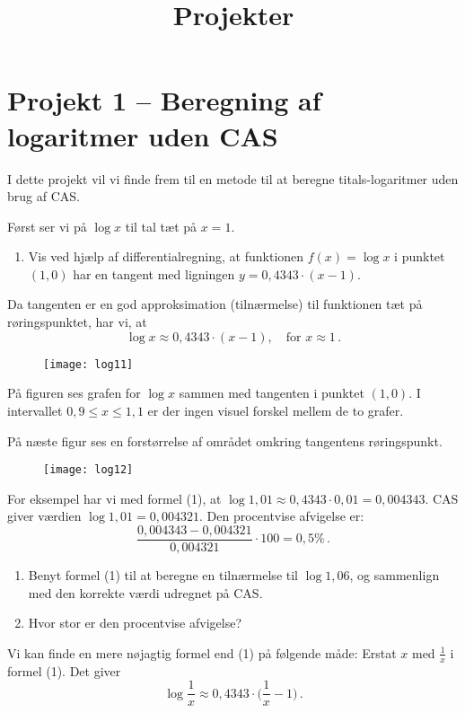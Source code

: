 \documentclass[12pt,oneside,a4paper]{article}
\title{Projekter}
\date{\vspace{-5ex}}
\theoremstyle{plain}
\begin{document}
\maketitle

\section*{Projekt 1 -- Beregning af logaritmer uden CAS}
I dette projekt vil vi finde frem til en metode til at beregne
titals-logaritmer uden brug af CAS.

Først ser vi på $\log x$ til tal tæt på $x=1$.

\begin{enumerate}[label=(\alph*)]
    \item Vis ved hjælp af differentialregning, at funktionen $f(x) = \log x$ i
        punktet $(1, 0)$ har en tangent med ligningen $y = 0,4343 \cdot (x-1)$.
\end{enumerate}
Da tangenten er en god approksimation (tilnærmelse) til funktionen tæt på
røringspunktet, har vi, at 
\[
    \tag{1}
    \log x \approx 0,4343\cdot(x-1),\quad \mbox{for $x\approx 1$}\,.
\]

\begin{figure}[H]
    \centering
    \texttt{[image: log11]}
\end{figure}
På figuren ses grafen for $\log x$ sammen med tangenten i punktet $(1, 0)$. I
intervallet $0,9\le x\le 1,1$ er der ingen visuel forskel mellem de to grafer.

På næste figur ses en forstørrelse af området omkring tangentens røringspunkt.
\begin{figure}[H]
    \centering
    \texttt{[image: log12]}
\end{figure}

For eksempel har vi med formel (1), at $\log 1,01 \approx 0,4343\cdot 0,01 = 0,004343$.
CAS giver værdien $\log 1,01 = 0,004321$. Den procentvise afvigelse er:
\[
    \frac{0,004343-0,004321}{0,004321}\cdot 100 = 0,5 \% \,.
\]

\begin{enumerate}[label=(\alph*), resume]
    \item Benyt formel (1) til at beregne en tilnærmelse til $\log
        1,06$, og sammenlign med den korrekte værdi udregnet på CAS.
    \item Hvor stor er den procentvise afvigelse?
\end{enumerate}

Vi kan finde en mere nøjagtig formel end (1) på følgende måde: Erstat $x$ med
$\frac1x$ i formel (1). Det giver
\[
    \tag{2}
    \log\frac1x \approx 0,4343\cdot\Big(\frac1x-1\Big)\,.
\]
\end{document}
